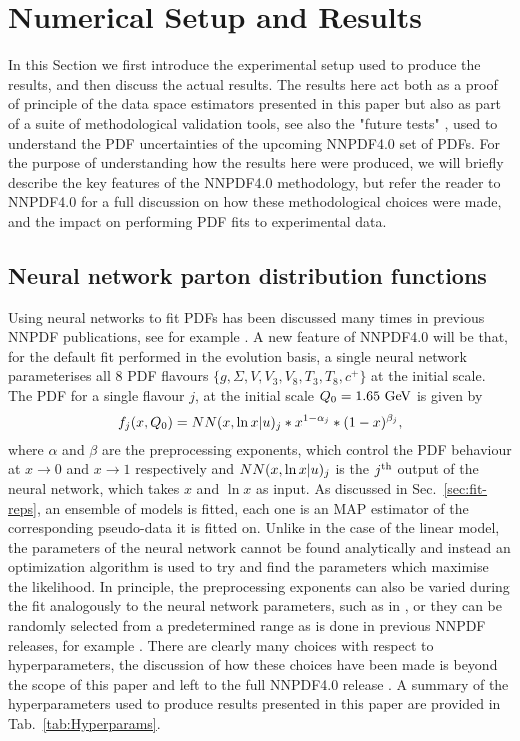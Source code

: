 \section{Numerical Setup and Results}

In this Section we first introduce the experimental setup used to produce the
results, and then discuss the actual results. The results here act both as a
proof of principle of the data space estimators presented in this paper but also
as part of a suite of methodological validation tools, see also the "future
tests" \cite{Cruz_Martinez_2021}, used to understand the PDF uncertainties of
the upcoming NNPDF4.0 set of PDFs. For the purpose of understanding how the
results here were produced, we will briefly describe the key features of the
NNPDF4.0 methodology, but refer the reader to NNPDF4.0 for a full discussion on
how these methodological choices were made, and the impact on performing PDF
fits to experimental data.

\subsection{Neural network parton distribution functions}

Using neural networks to fit PDFs has been discussed many times in previous
NNPDF publications, see for example \cite{nnpdf30, Ball_2017}. A new feature of
NNPDF4.0 will be that, for the default fit performed in the evolution basis, a
single neural network parameterises all 8 PDF flavours $\{ g, \Sigma, V, V_3,
V_8, T_3, T_8, c^+ \}$ at the initial scale. The PDF for a single flavour $j$,
at the initial scale $Q_0 = 1.65~{\rm GeV}$ is given by
\begin{equation}
    f_j(x, Q_0) = NN(x, \ln x | u)_j * x^{1-\alpha_j} * (1-x)^{\beta_j},
\end{equation}
where $\alpha$ and $\beta$ are the preprocessing exponents, which control the
PDF behaviour at $x \to 0$ and $x \to 1$ respectively and $NN(x, \ln x |
u)_j$ is the $j^{\rm th}$ output of the neural network, which takes $x$
and $\ln x$ as input. As discussed in Sec.~\ref{sec:fit-reps}, an ensemble of
models is fitted, each one is an MAP estimator of the corresponding pseudo-data
it is fitted on. Unlike in the case of the linear model, the parameters of the
neural network cannot be found analytically and instead an optimization
algorithm is used to try and find the parameters which maximise the likelihood.
In principle, the preprocessing exponents can also be varied during the fit
analogously to the neural network parameters, such as in \cite{Carrazza_2019},
or they can be randomly selected from a predetermined range as is done in
previous NNPDF releases, for example \cite{Ball_2017}. There are clearly many
choices with respect to hyperparameters, the discussion of how these choices
have been made is beyond the scope of this paper and left to the full NNPDF4.0
release \cite{NNPDF40}. A summary of the hyperparameters used to produce results
presented in this paper are provided in Tab.~\ref{tab:Hyperparams}.

